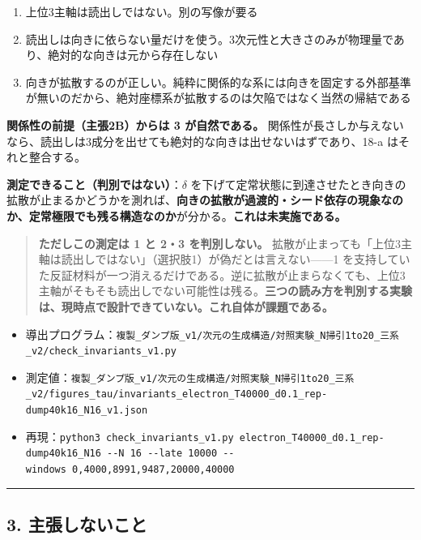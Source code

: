 \documentclass[
  10pt,
]{ltjsarticle}
\providecommand{\tightlist}{%
  \setlength{\itemsep}{0pt}\setlength{\parskip}{0pt}}
\begin{document}
\begin{enumerate}
\def\labelenumi{\arabic{enumi}.}
\tightlist
\item
  上位3主軸は読出しではない。別の写像が要る
\item
  読出しは向きに依らない量だけを使う。3次元性と大きさのみが物理量であり、絶対的な向きは元から存在しない
\item
  向きが拡散するのが正しい。純粋に関係的な系には向きを固定する外部基準が無いのだから、絶対座標系が拡散するのは欠陥ではなく当然の帰結である
\end{enumerate}

\textbf{関係性の前提（主張2B）からは 3 が自然である。}
関係性が長さしか与えないなら、読出しは3成分を出せても絶対的な向きは出せないはずであり、18-a
はそれと整合する。

\textbf{測定できること（判別ではない）}：\(\delta\)
を下げて定常状態に到達させたとき向きの拡散が止まるかどうかを測れば、\textbf{向きの拡散が過渡的・シード依存の現象なのか、定常極限でも残る構造なのか}が分かる。\textbf{これは未実施である。}

\begin{quote}
\textbf{ただしこの測定は 1 と 2・3 を判別しない。}
拡散が止まっても「上位3主軸は読出しではない」（選択肢1）が偽だとは言えない------1
を支持していた反証材料が一つ消えるだけである。逆に拡散が止まらなくても、上位3主軸がそもそも読出しでない可能性は残る。\textbf{三つの読み方を判別する実験は、現時点で設計できていない。これ自体が課題である。}
\end{quote}

\begin{itemize}
\tightlist
\item
  導出プログラム：\texttt{複製\_ダンプ版\_v1/次元の生成構造/対照実験\_N掃引1to20\_三系\_v2/check\_invariants\_v1.py}
\item
  測定値：\texttt{複製\_ダンプ版\_v1/次元の生成構造/対照実験\_N掃引1to20\_三系\_v2/figures\_tau/invariants\_electron\_T40000\_d0.1\_rep-dump40k16\_N16\_v1.json}
\item
  再現：\texttt{python3\ check\_invariants\_v1.py\ electron\_T40000\_d0.1\_rep-dump40k16\_N16\ -\/-N\ 16\ -\/-late\ 10000\ -\/-windows\ 0,4000,8991,9487,20000,40000}
\end{itemize}

\begin{center}\rule{0.5\linewidth}{0.5pt}\end{center}

\subsection{3.
主張しないこと}\label{ux4e3bux5f35ux3057ux306aux3044ux3053ux3068}
\end{document}
